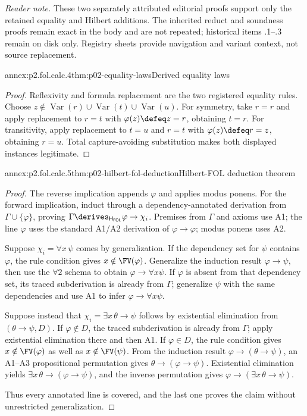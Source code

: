 \noindent\textit{Reader note.} These two separately attributed editorial proofs
support only the retained equality and Hilbert additions.  The inherited
reduct and soundness proofs remain exact in the body and are not repeated;
historical items .1--.3 remain on disk only.  Registry sheets provide
navigation and variant context, not source replacement.

\begin{annexitem}{annex:p2.fol.calc.4}{thm:p02-equality-laws}{Derived equality laws}
\begin{proof}
Reflexivity and formula replacement are the two registered equality rules.
Choose \(z\notin
\operatorname{Var}(r)\cup\operatorname{Var}(t)\cup\operatorname{Var}(u)\).
For symmetry, take \(r=r\) and apply replacement to \(r=t\) with
\(\varphi(z)\defeq z=r\), obtaining \(t=r\).  For transitivity, apply
replacement to \(t=u\) and \(r=t\) with
\(\varphi(z)\defeq r=z\), obtaining \(r=u\).  Total capture-avoiding
substitution makes both displayed instances legitimate.
\end{proof}
\end{annexitem}

\begin{annexitem}{annex:p2.fol.calc.5}{thm:p02-hilbert-fol-deduction}{Hilbert-FOL deduction theorem}
\begin{proof}
The reverse implication appends \(\varphi\) and applies modus ponens.  For
the forward implication, induct through a dependency-annotated derivation
from \(\Gamma\cup\{\varphi\}\), proving
\(\Gamma\derives_{\mathsf H_{\mathsf{FOL}}}\varphi\to\chi_i\).
Premises from \(\Gamma\) and axioms use A1; the line \(\varphi\) uses the
standard A1/A2 derivation of \(\varphi\to\varphi\); modus ponens uses A2.

Suppose \(\chi_i=\forall x\,\psi\) comes by generalization.  If the
dependency set for \(\psi\) contains \(\varphi\), the rule condition gives
\(x\notin\FV(\varphi)\).  Generalize the induction result
\(\varphi\to\psi\), then use the \(\forall2\) schema to obtain
  \(\varphi\to\forall x\psi\).  If \(\varphi\) is absent from that dependency
  set, its traced subderivation is already from \(\Gamma\); generalize
  \(\psi\) with the same dependencies and use A1 to infer
  \(\varphi\to\forall x\psi\).

  Suppose instead that \(\chi_i=\exists x\,\theta\to\psi\) follows by
  existential elimination from \((\theta\to\psi,D)\).  If
  \(\varphi\notin D\), the traced subderivation is already from \(\Gamma\);
  apply existential elimination there and then A1.  If \(\varphi\in D\), the
  rule condition gives \(x\notin\FV(\varphi)\) as well as
  \(x\notin\FV(\psi)\).  From the induction result
  \(\varphi\to(\theta\to\psi)\), an A1--A3 propositional permutation gives
  \(\theta\to(\varphi\to\psi)\).  Existential elimination yields
  \(\exists x\,\theta\to(\varphi\to\psi)\), and the inverse permutation gives
  \(\varphi\to(\exists x\,\theta\to\psi)\).

  Thus every annotated line is covered, and the
  last one proves the claim without unrestricted generalization.
\end{proof}
\end{annexitem}
